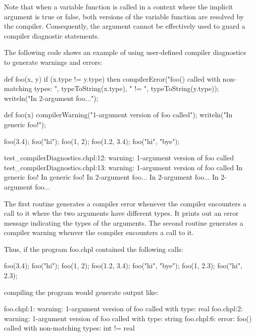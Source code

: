 Note that when a variable function is called in a context where the
implicit  argument is true or false, both versions of the
variable function are resolved by the compiler.  Consequently,
the  argument cannot be effectively used to guard a
compiler diagnostic statements.

\begin{example}
The following code shows an example of using user-defined compiler
diagnostics to generate warnings and errors:
\begin{chapelpre}
\end{chapelpre}
\begin{chapel}
def foo(x, y) {
  if (x.type != y.type) then
    compilerError("foo() called with non-matching types: ", 
                  typeToString(x.type), " != ", typeToString(y.type));
  writeln("In 2-argument foo...");
}

def foo(x) {
  compilerWarning("1-argument version of foo called");
  writeln("In generic foo!");
}
\end{chapel}
\begin{chapelpost}
foo(3.4);
foo("hi");
foo(1, 2);
foo(1.2, 3.4);
foo("hi", "bye");
\end{chapelpost}
\begin{chapeloutput}
test\_compilerDiagnostics.chpl:12: warning: 1-argument version of foo called
test\_compilerDiagnostics.chpl:13: warning: 1-argument version of foo called
In generic foo!
In generic foo!
In 2-argument foo...
In 2-argument foo...
In 2-argument foo...
\end{chapeloutput}

The first routine generates a compiler error whenever the compiler
encounters a call to it where the two arguments have different types.
It prints out an error message indicating the types of the arguments.
The second routine generates a compiler warning whenver the compiler
encounters a call to it.

Thus, if the program foo.chpl contained the following calls:

\begin{numberedchapel}
foo(3.4);
foo("hi");
foo(1, 2);
foo(1.2, 3.4);
foo("hi", "bye");
foo(1, 2.3);
foo("hi", 2.3);
\end{numberedchapel}

\noindent compiling the program would generate output like:

\begin{commandline}
foo.chpl:1: warning: 1-argument version of foo called with type: real
foo.chpl:2: warning: 1-argument version of foo called with type: string
foo.chpl:6: error: foo() called with non-matching types: int != real
\end{commandline}

\end{example}

